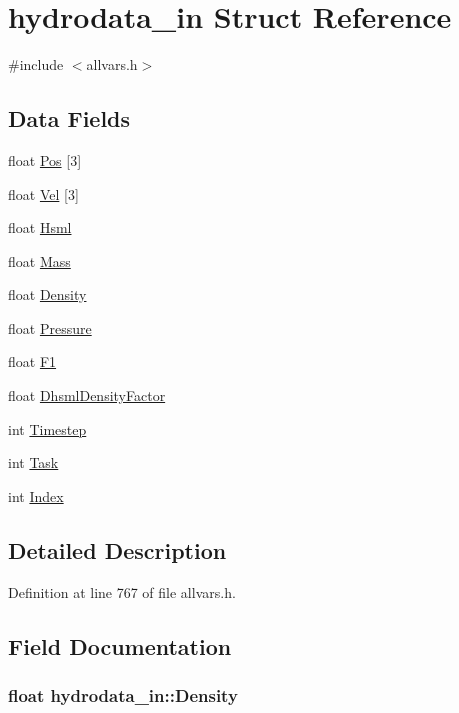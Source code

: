 \hypertarget{structhydrodata__in}{
\section{hydrodata\_\-in Struct Reference}
\label{structhydrodata__in}
}


{\ttfamily \#include $<$allvars.h$>$}

\subsection*{Data Fields}
\begin{DoxyCompactItemize}
\item 
float \hyperlink{structhydrodata__in_af50edb8226de4bdcdbcc0f2679cc694d}{Pos} \mbox{[}3\mbox{]}
\item 
float \hyperlink{structhydrodata__in_aac935e4620b7700cae000a32a2922df4}{Vel} \mbox{[}3\mbox{]}
\item 
float \hyperlink{structhydrodata__in_ae24f9ceb40451913af1ab6e793772bdd}{Hsml}
\item 
float \hyperlink{structhydrodata__in_a5fb05f5111cc5541a5f2d9ad647b0665}{Mass}
\item 
float \hyperlink{structhydrodata__in_ac408286b56271e4e30f8c149a812948c}{Density}
\item 
float \hyperlink{structhydrodata__in_a95298759ae954d623a92d59f71d318ba}{Pressure}
\item 
float \hyperlink{structhydrodata__in_a2b0cc9653b307eac998cec7175036b20}{F1}
\item 
float \hyperlink{structhydrodata__in_ad2da50b0d4b51a53f9fb5cb4c41f20b8}{DhsmlDensityFactor}
\item 
int \hyperlink{structhydrodata__in_a6b2160624adc7ad0304597845531ffa7}{Timestep}
\item 
int \hyperlink{structhydrodata__in_a7d38ae5b3289a90c4d33add0572942cc}{Task}
\item 
int \hyperlink{structhydrodata__in_a630be87b2fd46a0e22f57bde1a48e015}{Index}
\end{DoxyCompactItemize}


\subsection{Detailed Description}


Definition at line 767 of file allvars.h.



\subsection{Field Documentation}
\hypertarget{structhydrodata__in_ac408286b56271e4e30f8c149a812948c}{
\subsubsection[{Density}]{\setlength{\rightskip}{0pt plus 5cm}float {\bf hydrodata\_\-in::Density}}}
\label{structhydrodata__in_ac408286b56271e4e30f8c149a812948c}


